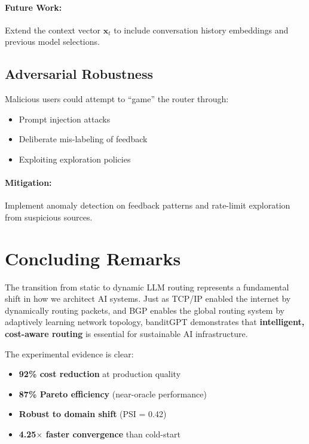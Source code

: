 \documentclass[sigconf]{acmart}
\begin{document}
\paragraph{Future Work:} Extend the context vector $\mathbf{x}_t$ to include conversation history embeddings and previous model selections.

\subsection{Adversarial Robustness}

Malicious users could attempt to ``game'' the router through:
\begin{itemize}
    \item Prompt injection attacks
    \item Deliberate mis-labeling of feedback
    \item Exploiting exploration policies
\end{itemize}

\paragraph{Mitigation:} Implement anomaly detection on feedback patterns and rate-limit exploration from suspicious sources.

\section{Concluding Remarks}

The transition from static to dynamic LLM routing represents a fundamental shift in how we architect AI systems. Just as TCP/IP enabled the internet by dynamically routing packets, and BGP enables the global routing system by adaptively learning network topology, banditGPT demonstrates that \textbf{intelligent, cost-aware routing} is essential for sustainable AI infrastructure.

The experimental evidence is clear:
\begin{itemize}
    \item \textbf{92\% cost reduction} at production quality
    \item \textbf{87\% Pareto efficiency} (near-oracle performance)
    \item \textbf{Robust to domain shift} (PSI = 0.42)
    \item \textbf{4.25$\times$ faster convergence} than cold-start
\end{itemize}
\end{document}
